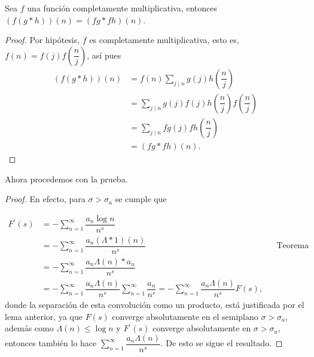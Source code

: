 \documentclass[12pt, a4paper]{article}
\begin{document}
\begin{lemma}
	Sea $f$ una función completamente multiplicativa, entonces $(f(g*h))(n)=(fg*fh)(n)$.
\end{lemma}

\begin{proof}
	Por hipótesis, $f$ es completamente multiplicativa, esto es, $f(n)=f(j)f\left(\dfrac{n}{j}\right)$, así pues
	\begin{align*}
		(f(g*h))(n) & =f(n)\sum_{j\mid n}g(j)h\left(\dfrac{n}{j}\right)                           \\
		            & =\sum_{j\mid n}g(j)f(j)h\left(\dfrac{n}{j}\right)f\left(\dfrac{n}{j}\right) \\
		            & =\sum_{j\mid n}fg(j)fh\left(\dfrac{n}{j}\right)                             \\
		            & =(fg*fh)(n).
	\end{align*}
\end{proof}

Ahora procedemos con la prueba.

\begin{proof}
	En efecto, para $\sigma>\sigma_a$ se cumple que

	\begin{align*}
		F^\prime(s) & =-\sum_{n=1}^\infty\dfrac{a_n\log n}{n^s}                                                                                                                                         \\
		            & =-\sum_{n=1}^\infty\dfrac{a_n(\Lambda*1)(n)}{n^s}                                                                                &  & \text{Teorema Fundamental de la Aritmética} \\
		            & =-\sum_{n=1}^\infty\dfrac{a_n\Lambda(n)*a_n}{n^s}                                                                                                                                 \\
		            & =-\sum_{n=1}^\infty\dfrac{a_n\Lambda(n)}{n^s}\sum_{n=1}^\infty\dfrac{a_n}{n^s}=-\sum_{n=1}^\infty\dfrac{a_n\Lambda(n)}{n^s}F(s),
	\end{align*}
	donde la separación de esta convolución como un producto, está justificada por el lema anterior, ya que $F(s)$ converge absolutamente en el semiplano $\sigma>\sigma_a$, además como $\Lambda(n)\leq \log n$ y $F^\prime(s)$ converge absolutamente en $\sigma>\sigma_a$, entonces también lo hace $\displaystyle\sum_{n=1}^\infty\dfrac{a_n\Lambda(n)}{n^s}.$ De esto se sigue el resultado.
\end{proof}
\end{document}
